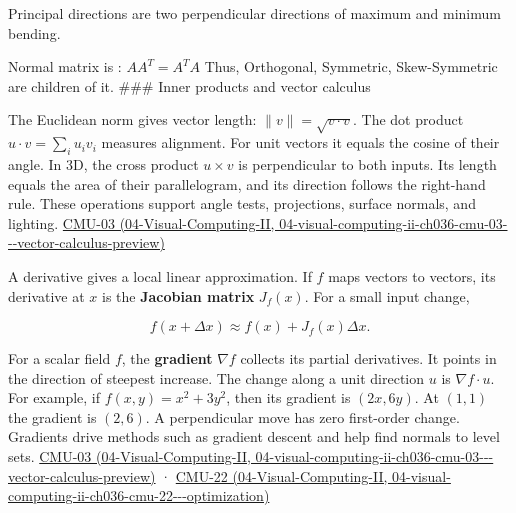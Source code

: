 Principal directions are two perpendicular directions of maximum and minimum bending.

Normal matrix is : \(AA^T = A^T A\) Thus, Orthogonal, Symmetric, Skew-Symmetric are children of it. \#\#\# Inner products and vector calculus

The Euclidean norm gives vector length: \(\|v\|=\sqrt{v\cdot v}\). The dot product \(u\cdot v=\sum_i u_iv_i\) measures alignment. For unit vectors it equals the cosine of their angle. In 3D, the cross product \(u\times v\) is perpendicular to both inputs. Its length equals the area of their parallelogram, and its direction follows the right-hand rule. These operations support angle tests, projections, surface normals, and lighting. \href{../04-Visual-Computing-II/main.pdf\#nameddest=04-visual-computing-ii-ch036-cmu-03---vector-calculus-preview}{CMU-03 (04-Visual-Computing-II, 04-visual-computing-ii-ch036-cmu-03-\/-\/-vector-calculus-preview)}

A derivative gives a local linear approximation. If \(f\) maps vectors to vectors, its derivative at \(x\) is the \textbf{Jacobian matrix} \(J_f(x)\). For a small input change,

\[
f(x+\Delta x)\approx f(x)+J_f(x)\Delta x.
\]

For a scalar field \(f\), the \textbf{gradient} \(\nabla f\) collects its partial derivatives. It points in the direction of steepest increase. The change along a unit direction \(u\) is \(\nabla f\cdot u\). For example, if \(f(x,y)=x^2+3y^2\), then its gradient is \((2x,6y)\). At \((1,1)\) the gradient is \((2,6)\). A perpendicular move has zero first-order change. Gradients drive methods such as gradient descent and help find normals to level sets. \href{../04-Visual-Computing-II/main.pdf\#nameddest=04-visual-computing-ii-ch036-cmu-03---vector-calculus-preview}{CMU-03 (04-Visual-Computing-II, 04-visual-computing-ii-ch036-cmu-03-\/-\/-vector-calculus-preview)} · \href{../04-Visual-Computing-II/main.pdf\#nameddest=04-visual-computing-ii-ch036-cmu-22---optimization}{CMU-22 (04-Visual-Computing-II, 04-visual-computing-ii-ch036-cmu-22-\/-\/-optimization)}

